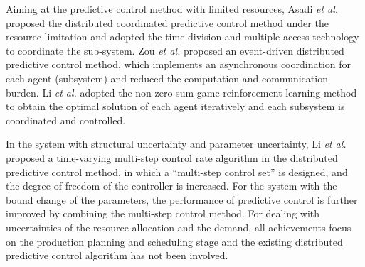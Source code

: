 \documentclass[conference]{IEEEtran}
\begin{document}
Aiming at the predictive control method with limited resources, Asadi \emph{et al.} \cite{asadi} proposed the distributed coordinated predictive control method under the resource limitation and adopted the time-division and multiple-access technology to coordinate the sub-system. Zou \emph{et al.} \cite{zouyy} proposed an event-driven distributed predictive control method, which implements an asynchronous coordination for each agent (subsystem) and reduced the computation and communication burden. Li \emph{et al.} \cite{lijn} adopted the non-zero-sum game reinforcement learning method to obtain the optimal solution of each agent iteratively and each subsystem is coordinated and controlled.

In the system with structural uncertainty and parameter uncertainty, Li \emph{et al.} \cite{lidewei} proposed a time-varying multi-step control rate algorithm in the distributed predictive control method, in which a ``multi-step control set'' is designed, and the degree of freedom of the controller is increased. For the system with the bound change of the parameters, the performance of predictive control is further improved by combining the multi-step control method. For dealing with uncertainties of the resource allocation and the demand, all achievements focus on the production planning and scheduling stage and the existing distributed predictive control algorithm has not been involved.


\end{document}
